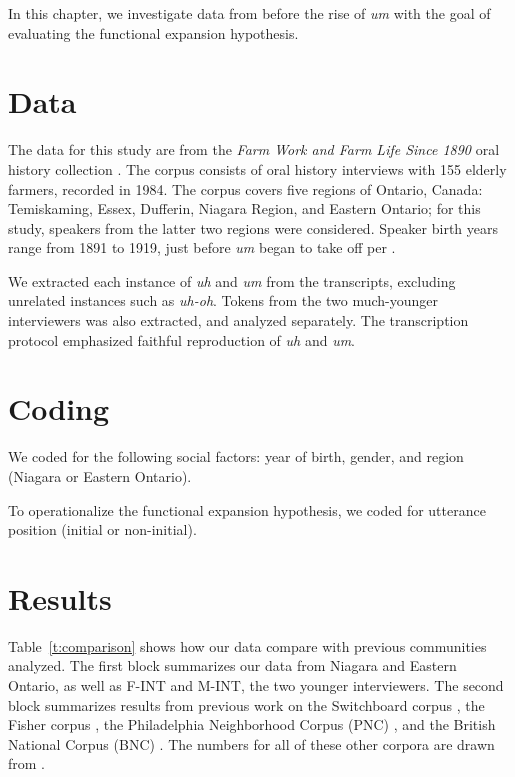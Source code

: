 \documentclass{article}
\begin{document}

In this chapter, we investigate data from before the rise of \emph{um} with the
goal of evaluating the functional expansion hypothesis.

\section{Data}

The data for this study are from the \emph{Farm Work and Farm Life Since 1890}
oral history collection \parencite{denis2016}.
The corpus consists of oral history interviews with 155 elderly farmers,
recorded in 1984.
The corpus covers five regions of Ontario, Canada: Temiskaming, Essex, Dufferin,
Niagara Region, and Eastern Ontario; for this study, speakers from the latter
two regions were considered.
Speaker birth years range from 1891 to 1919, just before \emph{um} began to take
off per \textcite{fruehwald2016}.

We extracted each instance of \emph{uh} and \emph{um} from the transcripts,
excluding unrelated instances such as \emph{uh-oh}.
Tokens from the two much-younger interviewers was also extracted, and analyzed
separately.
The transcription protocol emphasized faithful reproduction of \emph{uh} and
\emph{um}.

\section{Coding}

We coded for the following social factors:
year of birth, gender, and region (Niagara or Eastern Ontario).

To operationalize the functional expansion hypothesis, we coded for utterance
position (initial or non-initial).


\section{Results}

Table~\ref{t:comparison} shows how our data compare with previous communities
analyzed.
The first block summarizes our data from Niagara and Eastern Ontario, as well as
F-INT and M-INT, the two younger interviewers.
The second block summarizes results from previous work on the Switchboard corpus
\parencite{switchboard}, the Fisher corpus \parencite{fisher}, the Philadelphia
Neighborhood Corpus (PNC) \parencite{labovrosenfelder2011}, and the British
National Corpus (BNC) \parencite{bnc}.
The numbers for all of these other corpora are drawn from
\textcite{wielingetal2016}.
\end{document}
